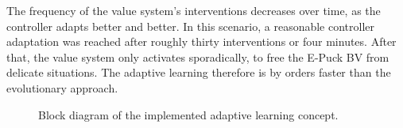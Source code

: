 \documentclass[a4paper]{jacow}
\begin{document}
The frequency of the value system's interventions decreases over time, as the controller adapts better and better. In this scenario, a reasonable controller adaptation was reached after roughly thirty interventions or four minutes. After that, the value system only activates sporadically, to free the E-Puck BV from delicate situations. The adaptive learning therefore is by orders faster than the evolutionary approach.

\begin{figure}[htbp]
	\centering
	
	\caption{Block diagram of the implemented adaptive learning concept.}
	\label{fig:adaptivelearningsketch}
\end{figure}
\end{document}
